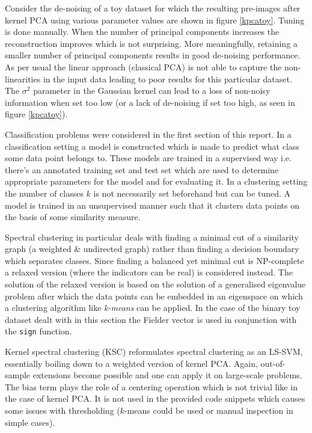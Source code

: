 \par Consider the de-noising of a toy dataset for which the resulting pre-images after kernel PCA using various parameter values are shown in figure \ref{kpcatoy}. Tuning is done manually. When the number of principal components increases the reconstruction improves which is not surprising. More meaningfully, retaining a smaller number of principal components results in good de-noising performance. As per usual the linear approach (classical PCA) is not able to capture the non-linearities in the input data leading to poor results for this particular dataset. The $\sigma^2$ parameter in the Gaussian kernel can lead to a loss of non-noisy information when set too low (or a lack of de-noising if set too high, as seen in figure \ref{kpcatoy}).


Classification problems were considered in the first section of this report. In a classification setting a model is constructed which is made to predict what class some data point belongs to. These models are trained in a supervised way i.e. there's an annotated training set and test set which are used to determine appropriate parameters for the model and for evaluating it. In a clustering setting the number of classes $k$ is not necessarily set beforehand but can be tuned. A model is trained in an unsupervised manner such that it clusters data points on the basis of some similarity measure. 

\par Spectral clustering in particular deals with finding a minimal cut of a similarity graph (a weighted \& undirected graph) rather than finding a decision boundary which separates classes. Since finding a balanced yet minimal cut is NP-complete a relaxed version (where the indicators can be real) is considered instead. The solution of the relaxed version is based on the solution of a generalised eigenvalue problem after which the data points can be embedded in an eigenspace on which a clustering algorithm like \textit{k-means} can be applied. In the case of the binary toy dataset dealt with in this section the Fielder vector is used in conjunction with the \texttt{sign} function.

\par Kernel spectral clustering (KSC) reformulates spectral clustering as an LS-SVM, essentially boiling down to a weighted version of kernel PCA. Again, out-of-sample extensions become possible and one can apply it on large-scale problems. The bias term plays the role of a centering operation which is not trivial like in the case of kernel PCA. It is not used in the provided code snippets which causes some issues with thresholding ($k$-means could be used or manual inspection in simple cases).

